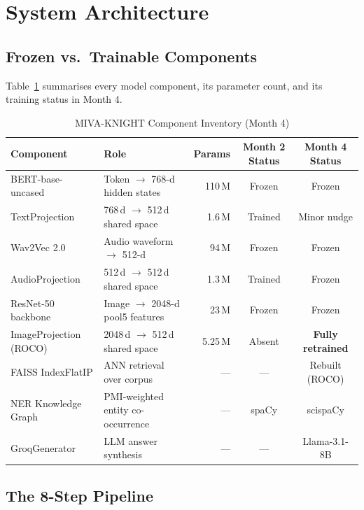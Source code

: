 \documentclass[12pt, a4paper]{article}
\theoremstyle{definition}
\theoremstyle{plain}
\theoremstyle{remark}
\begin{document}
\section{System Architecture}
\label{sec:architecture}

\subsection{Frozen vs.\ Trainable Components}

Table~\ref{tab:components} summarises every model component, its parameter count, and its training status in Month 4.

\begin{table}[h]
\centering
\caption{MIVA-KNIGHT Component Inventory (Month 4)}
\label{tab:components}
\begin{tabular}{llrcc}
\toprule
\textbf{Component} & \textbf{Role} & \textbf{Params} & \textbf{Month 2 Status} & \textbf{Month 4 Status} \\
\midrule
BERT-base-uncased      & Token $\to$ 768-d hidden states & 110\,M & Frozen  & Frozen  \\
TextProjection         & 768\,d $\to$ 512\,d shared space & 1.6\,M  & Trained & Minor nudge \\
Wav2Vec 2.0            & Audio waveform $\to$ 512-d        & 94\,M  & Frozen  & Frozen  \\
AudioProjection        & 512\,d $\to$ 512\,d shared space & 1.3\,M  & Trained & Frozen  \\
ResNet-50 backbone     & Image $\to$ 2048-d pool5 features & 23\,M  & Frozen  & Frozen  \\
\rowcolor{trainableorange}
ImageProjection (ROCO) & 2048\,d $\to$ 512\,d shared space & 5.25\,M & Absent  & \textbf{Fully retrained} \\
FAISS IndexFlatIP      & ANN retrieval over corpus           & ---    & ---     & Rebuilt (ROCO) \\
NER Knowledge Graph    & PMI-weighted entity co-occurrence  & ---    & spaCy   & scispaCy \\
GroqGenerator          & LLM answer synthesis               & ---    & ---     & Llama-3.1-8B \\
\bottomrule
\end{tabular}
\end{table}

\subsection{The 8-Step Pipeline}
\end{document}
